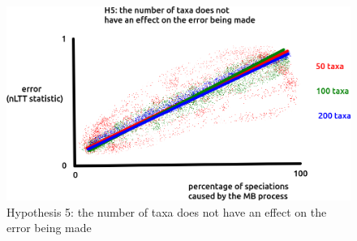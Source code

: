 \begin{figure}[!htbp]
  \includegraphics[width=\textwidth]{razzo-figures/fig_h_5.png}
  \caption{
    Hypothesis 5: the number of taxa does not
    have an effect on the error being made
  }
  \label{fig:h_5}
\end{figure}